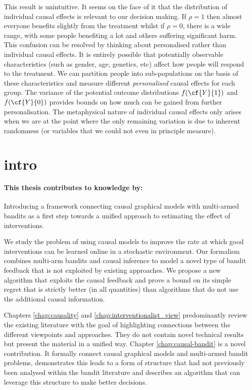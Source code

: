 This result is unintuitive. It seems on the face of it that the distribution of individual causal effects is relevant to our decision making. If $\rho = 1$ then almost everyone benefits slightly from the treatment whilst if $\rho=0$, there is a wide range, with some people benefiting a lot and others suffering significant harm. This confusion can be resolved by thinking about personalised rather than individual causal effects. It is entirely possible that potentially observable characteristics (such as gender, age, genetics, etc) affect how people will respond to the treatment. We can partition people into sub-populations on the basis of these characteristics and measure different \emph{personalised} causal effects for each group. The variance of the potential outcome distributions $f(\cf{Y}{1})$ and $f(\cf{Y}{0})$ provides bounds on how much can be gained from further personalisation. The metaphysical nature of individual causal effects only arises when we are at the point where the only remaining variation is due to inherent randomness (or variables that we could not even in principle measure). 

\section{intro}
\paragraph*{This thesis contributes to knowledge by:} Introducing a framework connecting causal graphical models with multi-armed bandits as a first step towards a unified approach to estimating the effect of interventions.  

We study the problem of using causal models to improve the rate at which good interventions can be learned online in a stochastic environment. 
Our formalism combines multi-arm bandits and causal inference to model a novel type of bandit feedback that is not exploited by existing approaches.
We propose a new algorithm that exploits the causal feedback and prove a bound on its simple regret that is strictly better (in all quantities) 
than algorithms that do not use the additional causal information. 


Chapters \ref{chap:causality} and \ref{chap:interventionalist_view} predominantly review the existing literature with the goal of highlighting connections between the different viewpoints and approaches. They do not contain novel technical results but present the material in a unified way. Chapter \ref{chap:causal-bandit} is a novel contribution. It formally connect causal graphical models and multi-armed bandit problems, demonstrates this leads to a form of structure that had not previously been analysed within the bandit literature and describes an algorithm that can leverage this structure to make better decisions. 

